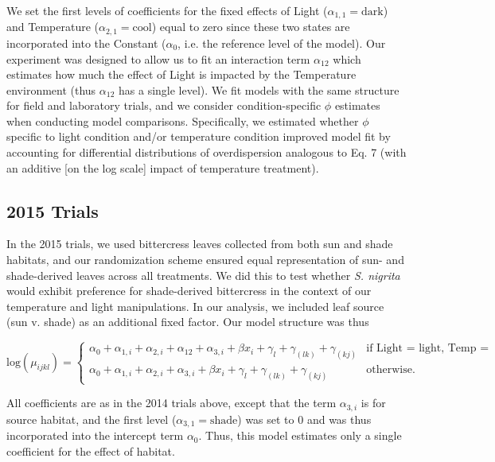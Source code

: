 \documentclass[11pt, oneside]{amsart}
\begin{document}
We set the first levels of coefficients for the fixed effects of Light ($\alpha_{1,1} = \text{dark}$) and Temperature ($\alpha_{2,1} = \text{cool}$) equal to zero since these two states are incorporated into the Constant ($\alpha_0$, i.e. the reference level of the model). Our experiment was designed to allow us to fit an interaction term $\alpha_{12}$ which estimates how much the effect of Light is impacted by the Temperature environment (thus $\alpha_{12}$ has a single level). We fit models with the same structure for field and laboratory trials, and we consider condition-specific $\phi$ estimates when conducting model comparisons. Specifically, we estimated whether $\phi$ specific to light condition and/or temperature condition improved model fit by accounting for differential distributions of overdispersion analogous to Eq. 7 (with an additive [on the log scale] impact of temperature treatment).

\subsection{2015 Trials}
In the 2015 trials, we used bittercress leaves collected from both sun and shade habitats, and our randomization scheme ensured equal representation of sun- and shade-derived leaves across all treatments. We did this to test whether \emph{S. nigrita} would exhibit preference for shade-derived bittercress in the context of our temperature and light manipulations. In our analysis, we included leaf source (sun v. shade) as an additional fixed factor. Our model structure was thus

\begin{equation}
\text{log}(\mu_{ijkl}) = \begin{cases}
\alpha_0 + \alpha_{1,i} + \alpha_{2,i} + \alpha_{12} + \alpha_{3,i} + \beta x_i + \gamma_l + \gamma_{(lk)} + \gamma_{(kj)} 
& \text{if Light = light, Temp = warm}\\
\alpha_0 + \alpha_{1,i} + \alpha_{2,i} + \alpha_{3,i} + \beta x_i + \gamma_l + \gamma_{(lk)} + \gamma_{(kj)} 	  		 
& \text{otherwise}.
\end{cases}
\end{equation}

All coefficients are as in the 2014 trials above, except that the term $\alpha_{3,i}$ is for source habitat, and the first level ($\alpha_{3,1} = \text{shade}$) was set to $0$ and was thus incorporated into the intercept term $\alpha_0$. Thus, this model estimates only a single coefficient for the effect of habitat.
\end{document}
